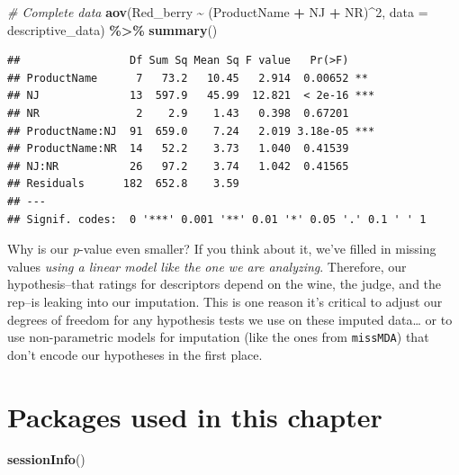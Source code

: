\documentclass[
]{book}
\newenvironment{Shaded}{\begin{snugshade}}{\end{snugshade}}
\newcommand{\AttributeTok}[1]{\textcolor[rgb]{0.13,0.29,0.53}{#1}}
\newcommand{\CommentTok}[1]{\textcolor[rgb]{0.56,0.35,0.01}{\textit{#1}}}
\newcommand{\DecValTok}[1]{\textcolor[rgb]{0.00,0.00,0.81}{#1}}
\newcommand{\FunctionTok}[1]{\textcolor[rgb]{0.13,0.29,0.53}{\textbf{#1}}}
\newcommand{\NormalTok}[1]{#1}
\newcommand{\SpecialCharTok}[1]{\textcolor[rgb]{0.81,0.36,0.00}{\textbf{#1}}}
\begin{document}
\begin{Shaded}
\begin{Highlighting}[]
\CommentTok{\# Complete data}
\FunctionTok{aov}\NormalTok{(Red\_berry }\SpecialCharTok{\textasciitilde{}}\NormalTok{ (ProductName }\SpecialCharTok{+}\NormalTok{ NJ }\SpecialCharTok{+}\NormalTok{ NR)}\SpecialCharTok{\^{}}\DecValTok{2}\NormalTok{, }
    \AttributeTok{data =}\NormalTok{ descriptive\_data) }\SpecialCharTok{\%\textgreater{}\%}
  \FunctionTok{summary}\NormalTok{()}
\end{Highlighting}
\end{Shaded}

\begin{verbatim}
##                 Df Sum Sq Mean Sq F value   Pr(>F)    
## ProductName      7   73.2   10.45   2.914  0.00652 ** 
## NJ              13  597.9   45.99  12.821  < 2e-16 ***
## NR               2    2.9    1.43   0.398  0.67201    
## ProductName:NJ  91  659.0    7.24   2.019 3.18e-05 ***
## ProductName:NR  14   52.2    3.73   1.040  0.41539    
## NJ:NR           26   97.2    3.74   1.042  0.41565    
## Residuals      182  652.8    3.59                     
## ---
## Signif. codes:  0 '***' 0.001 '**' 0.01 '*' 0.05 '.' 0.1 ' ' 1
\end{verbatim}

Why is our \emph{p}-value even smaller? If you think about it, we've filled in missing values \emph{using a linear model like the one we are analyzing}. Therefore, our hypothesis--that ratings for descriptors depend on the wine, the judge, and the rep--is leaking into our imputation. This is one reason it's critical to adjust our degrees of freedom for any hypothesis tests we use on these imputed data\ldots{} or to use non-parametric models for imputation (like the ones from \texttt{missMDA}) that don't encode our hypotheses in the first place.

\section{Packages used in this chapter}\label{packages-used-in-this-chapter-2}

\begin{Shaded}
\begin{Highlighting}[]
\FunctionTok{sessionInfo}\NormalTok{()}
\end{Highlighting}
\end{Shaded}
\end{document}
